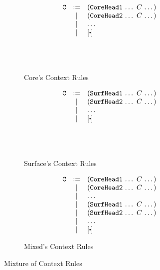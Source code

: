 \begin{figure}[t]
	\centering
	\begin{subfigure}{0.3\linewidth}{\footnotesize
		\begin{flushleft}
			\[
			\begin{array}{lcl}
			\m{C} &:=& (\m{CoreHead1}~$\ldots$~C~$\ldots$)\\
			&|& (\m{CoreHead2}~$\ldots$~C~$\ldots$)\\
			&|& $\ldots$\\
			&|&[\bigcdot]\\[4em]
			\end{array}
			\]
			\end{flushleft}
		\caption{Core's Context Rules}
		\label{fig:corecontext}
	}
	\end{subfigure}
	\begin{subfigure}{0.3\linewidth}{\footnotesize
		\begin{flushleft}
			\[
			\begin{array}{lcl}
			\m{C} &:=& (\m{SurfHead1}~$\ldots$~C~$\ldots$)\\
			&|& (\m{SurfHead2}~$\ldots$~C~$\ldots$)\\
			&|& $\ldots$\\
			&|&[\bigcdot]\\[4em]
			\end{array}
			\]
			\end{flushleft}
		\caption{Surface's Context Rules}
		\label{fig:surfcontext}
	}
	\end{subfigure}
	\begin{subfigure}{0.3\linewidth}{\footnotesize
		\begin{flushleft}
			\[
			\begin{array}{lcl}
			\m{C} &:=& (\m{CoreHead1}~$\ldots$~C~$\ldots$)\\
			&|& (\m{CoreHead2}~$\ldots$~C~$\ldots$)\\
			&|& $\ldots$\\
			&|& (\m{SurfHead1}~$\ldots$~C~$\ldots$)\\
			&|& (\m{SurfHead2}~$\ldots$~C~$\ldots$)\\
			&|& $\ldots$\\
			&|&[\bigcdot]\\
			\end{array}
			\]
			\end{flushleft}
		\caption{Mixed's Context Rules}
		\label{fig:mixedcontext}
	}
	\end{subfigure}

\caption{Mixture of Context Rules}
\label{fig:mixofcontext}
\end{figure}


